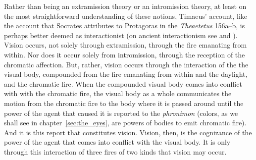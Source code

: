 Rather than being an extramission theory or an intromission theory, at least on the most straightforward understanding of these notions, Timaeus' account, like the account that Socrates attributes to Protagoras in the \emph{Theaetetus} 156a--b, is perhaps better deemed as interactionist (on ancient interactionism see  \citealt{Remes:2014en} and \citealt{Squire:2016aa}). Vision occurs, not solely through extramission, through the fire emanating from within. Nor does it occur solely from intromission, through the reception of the chromatic affection. But, rather, vision occurs through the interaction of the the visual body, compounded from the fire emanating from within and the daylight, and the chromatic fire. When the compounded visual body comes into conflict with with the chromatic fire, the visual body as a whole communicates the motion from the chromatic fire to the body where it is passed around until the power of the agent that caused it is reported to the \emph{phronimon} (colors, as we shall see in chapter~\ref{sec:the_eyes}, are powers of bodies to emit chromatic fire). And it is this report that constitutes vision. Vision, then, is the cognizance of the power of the agent that comes into conflict with the visual body. It is only through this interaction of three fires of two kinds that vision may occur.






